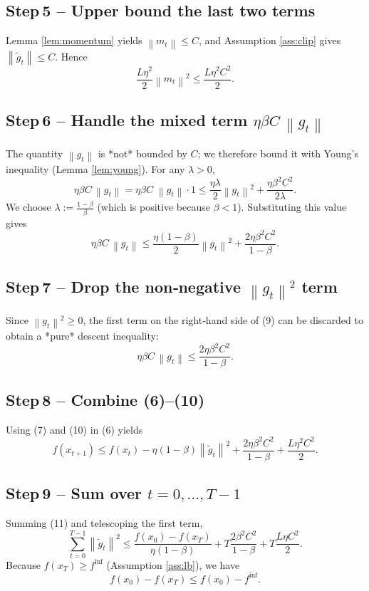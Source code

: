 \documentclass{article}
\newcommand{\norm}[1]{\left\lVert#1\right\rVert}
\begin{document}
\subsection*{Step 5 – Upper bound the last two terms}
Lemma \ref{lem:momentum} yields $\norm{m_t}\le C$, and Assumption \ref{ass:clip} gives $\norm{\tilde g_t}\le C$. Hence
\[
\frac{L\eta^{2}}{2}\norm{m_t}^{2}\le\frac{L\eta^{2}C^{2}}{2}. \tag{7}
\]

\subsection*{Step 6 – Handle the mixed term $\eta\beta C\,\norm{g_t}$}
The quantity $\norm{g_t}$ is *not* bounded by $C$; we therefore bound it with Young’s inequality (Lemma \ref{lem:young}).  
For any $\lambda>0$,
\[
\eta\beta C\,\norm{g_t}
   = \eta\beta C\;\norm{g_t}\cdot 1
   \le \frac{\eta\lambda}{2}\norm{g_t}^{2}
        +\frac{\eta\beta^{2}C^{2}}{2\lambda}. \tag{8}
\]
We choose $\lambda:=\frac{1-\beta}{\beta}$ (which is positive because $\beta<1$). Substituting this value gives
\[
\eta\beta C\,\norm{g_t}
   \le \frac{\eta(1-\beta)}{2}\norm{g_t}^{2}
        +\frac{2\eta\beta^{2}C^{2}}{1-\beta}. \tag{9}
\]

\subsection*{Step 7 – Drop the non‑negative $\norm{g_t}^{2}$ term}
Since $\norm{g_t}^{2}\ge0$, the first term on the right‑hand side of (9) can be discarded to obtain a *pure* descent inequality:
\[
\eta\beta C\,\norm{g_t}
   \le \frac{2\eta\beta^{2}C^{2}}{1-\beta}. \tag{10}
\]

\subsection*{Step 8 – Combine (6)–(10)}
Using (7) and (10) in (6) yields
\[
f(x_{t+1})
\le f(x_t)
      -\eta(1-\beta)\norm{\tilde g_t}^{2}
      +\frac{2\eta\beta^{2}C^{2}}{1-\beta}
      +\frac{L\eta^{2}C^{2}}{2}. \tag{11}
\]

\subsection*{Step 9 – Sum over $t=0,\dots,T-1$}
Summing (11) and telescoping the first term,
\[
\sum_{t=0}^{T-1}\norm{\tilde g_t}^{2}
\le
\frac{f(x_0)-f(x_T)}{\eta(1-\beta)}
   +T\frac{2\beta^{2}C^{2}}{1-\beta}
   +T\frac{L\eta C^{2}}{2}. \tag{12}
\]
Because $f(x_T)\ge f^{\inf}$ (Assumption \ref{ass:lb}), we have
\[
f(x_0)-f(x_T)\le f(x_0)-f^{\inf}. \tag{13}
\]
\end{document}
